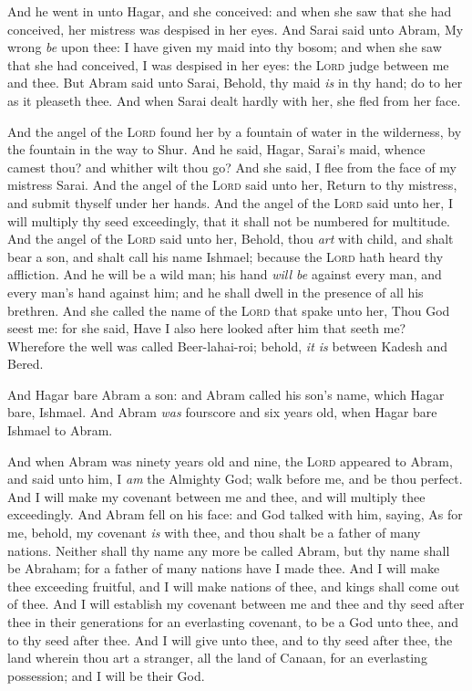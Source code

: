 \documentclass[11pt,letterpaper,oneside]{memoir}
\begin{document}
And he went in unto Hagar, and she conceived: and when she saw that she
had conceived, her mistress was despised in her eyes. And Sarai said
unto Abram, My wrong \emph{be} upon thee: I have given my maid into thy
bosom; and when she saw that she had conceived, I was despised in her
eyes: the \textsc{Lord} judge between me and thee. But Abram said unto
Sarai, Behold, thy maid \emph{is} in thy hand; do to her as it pleaseth
thee. And when Sarai dealt hardly with her, she fled from her face.

And the angel of the \textsc{Lord} found her by a fountain of water in the
wilderness, by the fountain in the way to Shur. And he said, Hagar,
Sarai's maid, whence camest thou? and whither wilt thou go? And she
said, I flee from the face of my mistress Sarai. And the angel of the
\textsc{Lord} said unto her, Return to thy mistress, and submit thyself
under her hands. And the angel of the \textsc{Lord} said unto her, I will
multiply thy seed exceedingly, that it shall not be numbered for
multitude. And the angel of the \textsc{Lord} said unto her, Behold, thou
\emph{art} with child, and shalt bear a son, and shalt call his name
Ishmael; because the \textsc{Lord} hath heard thy affliction. And he will
be a wild man; his hand \emph{will be} against every man, and every
man's hand against him; and he shall dwell in the presence of all his
brethren. And she called the name of the \textsc{Lord} that spake unto
her, Thou God seest me: for she said, Have I also here looked after him
that seeth me? Wherefore the well was called Beer-lahai-roi; behold,
\emph{it is} between Kadesh and Bered.

And Hagar bare Abram a son: and Abram called his son's name, which Hagar
bare, Ishmael. And Abram \emph{was} fourscore and six years old, when
Hagar bare Ishmael to Abram.

And when Abram was ninety years old and nine, the \textsc{Lord} appeared
to Abram, and said unto him, I \emph{am} the Almighty God; walk before
me, and be thou perfect. And I will make my covenant between me and
thee, and will multiply thee exceedingly. And Abram fell on his face:
and God talked with him, saying, As for me, behold, my covenant
\emph{is} with thee, and thou shalt be a father of many nations. Neither
shall thy name any more be called Abram, but thy name shall be Abraham;
for a father of many nations have I made thee. And I will make thee
exceeding fruitful, and I will make nations of thee, and kings shall
come out of thee. And I will establish my covenant between me and thee
and thy seed after thee in their generations for an everlasting
covenant, to be a God unto thee, and to thy seed after thee. And I will
give unto thee, and to thy seed after thee, the land wherein thou art a
stranger, all the land of Canaan, for an everlasting possession; and I
will be their God.
\end{document}
